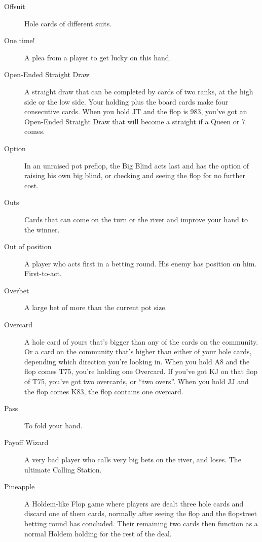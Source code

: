 \begin{description}
\item[Offsuit] Hole cards of different suits.

\item[One time!] A plea from a player to get lucky on this hand.

\item[Open-Ended Straight Draw] A straight draw that can be completed
by cards of two ranks, at the high side or the low side. Your holding
plus the board cards make four consecutive cards. When you hold JT
and the flop is 983, you've got an Open-Ended Straight Draw that will
become a straight if a Queen or 7 comes.

\item[Option] In an unraised pot preflop, the Big Blind acts last and
has the option of raising his own big blind, or checking and
seeing the flop for no further cost.

\item[Outs] Cards that can come on the turn or the river and improve
your hand to the winner.

\item[Out of position] A player who acts first in a betting round. His
enemy has position on him. First-to-act.

\item[Overbet] A large bet of more than the current pot size.


\item[Overcard] A hole card of yours that's bigger than any of the
cards on the community. Or a card on the community that's higher than
either of your hole cards, depending which direction you're looking
in. When you hold A8 and the flop comes T75, you're holding one
Overcard. If you've got KJ on that flop of T75, you've got two
overcards, or ``two overs''. When you hold JJ and the flop comes K83,
the flop contains one overcard.

\item[Pass] To fold your hand.

\item[Payoff Wizard] A very bad player who calls very big bets on the
river, and loses. The ultimate Calling Station.

\item[Pineapple] A Holdem-like Flop game where players are dealt three
hole cards and discard one of them cards, normally after seeing the
flop and the flopstreet betting round has concluded. Their remaining
two cards then function as a normal Holdem holding for the rest of the
deal.


\end{description}
